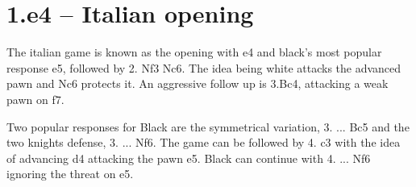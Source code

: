 \documentclass[
10pt, %
a4paper, %
oneside, %
headinclude,footinclude, %
BCOR5mm, %
]{scrartcl}
\title{\normalfont\spacedallcaps{Notes on chess}} %
\author{\spacedlowsmallcaps{Bruno Ximenez} }%
\date{21/12/2020} %
\begin{document}


\renewcommand{\sectionmark}[1]{\markright{\spacedlowsmallcaps{#1}}} %
\lehead{\mbox{\llap{\small\thepage\kern1em\color{halfgray} \vline}\color{halfgray}\hspace{0.5em}\rightmark\hfil}} %

\pagestyle{scrheadings} %



\maketitle %

\setcounter{tocdepth}{2} %

\tableofcontents %

\listoffigures %

\listoftables %

\newpage

\section{1.e4 -- Italian opening}

The italian game is known as the opening with e4 and black's most popular response e5, followed by 2. Nf3 Nc6. The idea being white attacks the advanced pawn and Nc6 protects it. An aggressive follow up is 3.Bc4, attacking a weak pawn on f7.


Two popular responses for Black are the symmetrical variation, 3. ... Bc5 and the two knights defense, 3. ... Nf6. The game can be followed by 4. c3 with the idea of advancing d4 attacking the pawn e5. Black can continue with 4. ... Nf6 ignoring the threat on e5. 
\end{document}
